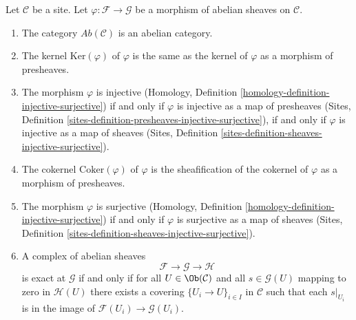 \begin{lemma}
\label{lemma-abelian-abelian}
Let $\mathcal{C}$ be a site. Let $\varphi : \mathcal{F} \to \mathcal{G}$
be a morphism of abelian sheaves on $\mathcal{C}$.
\begin{enumerate}
\item The category $\textit{Ab}(\mathcal{C})$ is an abelian category.
\item The kernel $\text{Ker}(\varphi)$ of $\varphi$ is the same as the
kernel of $\varphi$ as a morphism of presheaves.
\item The morphism $\varphi$ is injective
(Homology, Definition \ref{homology-definition-injective-surjective})
if and only if $\varphi$ is injective as a map of presheaves
(Sites, Definition \ref{sites-definition-presheaves-injective-surjective}),
if and only if $\varphi$ is injective as a map of sheaves
(Sites, Definition \ref{sites-definition-sheaves-injective-surjective}).
\item The cokernel $\text{Coker}(\varphi)$ of $\varphi$ is the sheafification
of the cokernel of $\varphi$ as a morphism of presheaves.
\item The morphism $\varphi$ is surjective
(Homology, Definition \ref{homology-definition-injective-surjective})
if and only if $\varphi$ is surjective as a map of sheaves
(Sites, Definition \ref{sites-definition-sheaves-injective-surjective}).
\item A complex of abelian sheaves
$$
\mathcal{F} \to \mathcal{G} \to \mathcal{H}
$$
is exact at $\mathcal{G}$ if and only if for all
$U \in \Ob(\mathcal{C})$ and all $s \in \mathcal{G}(U)$
mapping to zero in $\mathcal{H}(U)$ there exists a covering
$\{U_i \to U\}_{i \in I}$ in $\mathcal{C}$ such that each
$s|_{U_i}$ is in the image of $\mathcal{F}(U_i) \to \mathcal{G}(U_i)$.
\end{enumerate}
\end{lemma}


